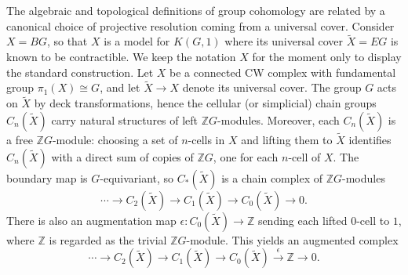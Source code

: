 \documentclass[aps,prx,reprint,superscriptaddress,twocolumn,amsmath,amssymb,amsfonts, nofootinbib]{revtex4-2}
\theoremstyle{apsstyle}
\begin{document}
The algebraic and topological definitions of group cohomology are related by a canonical choice of projective resolution coming from a universal cover. 
Consider $X=BG$, so that $X$ is a model for $K(G,1)$ where its universal cover $\widetilde X=EG$ is known to be contractible. We keep the notation $X$ for the moment only to display the standard construction. Let $X$ be a connected CW complex with fundamental group $\pi_1(X)\cong G$, and let $\widetilde{X}\to X$ denote its universal cover.
The group $G$ acts on $\widetilde{X}$ by deck transformations, hence the cellular (or simplicial) chain groups $C_n(\widetilde{X})$ carry natural structures of left $\mathbb{Z}G$-modules. Moreover, each $C_n(\widetilde{X})$ is a free $\mathbb{Z}G$-module: choosing a set of $n$-cells in $X$ and lifting them to $\widetilde{X}$ identifies $C_n(\widetilde{X})$ with a direct sum of copies of $\mathbb{Z}G$, one for each $n$-cell of $X$. The boundary map is $G$-equivariant, so $C_\ast(\widetilde{X})$ is a chain complex of $\mathbb{Z}G$-modules
\begin{equation}
    \cdots \longrightarrow C_2(\widetilde{X}) \longrightarrow C_1(\widetilde{X})
    \longrightarrow C_0(\widetilde{X}) \longrightarrow 0 .
\end{equation} 
There is also an augmentation map $\epsilon:C_0(\widetilde{X})\to \mathbb{Z}$ sending each lifted $0$-cell to $1$, where $\mathbb{Z}$ is regarded as the trivial $\mathbb{Z}G$-module. This yields an augmented complex
\begin{equation}
    \cdots \longrightarrow C_2(\widetilde{X}) \longrightarrow C_1(\widetilde{X})
    \longrightarrow C_0(\widetilde{X}) \xrightarrow{\ \epsilon\ } \mathbb{Z} \longrightarrow 0.
\end{equation}

\bigskip 
\end{document}
